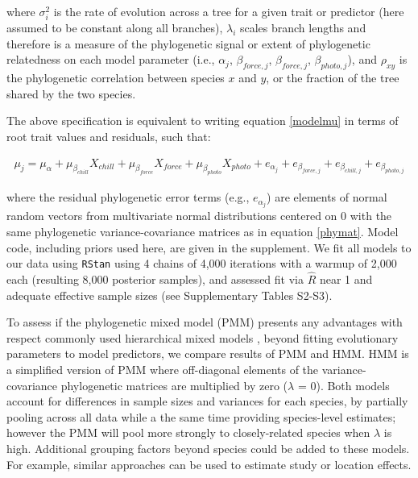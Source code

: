 \documentclass[11pt]{article}
\begin{document}
\noindent where $\sigma_i^2$ is the rate of evolution across a tree for a given trait or predictor (here assumed to be constant along all branches), $\lambda_i$ scales branch lengths and therefore is a measure of the phylogenetic signal or extent of phylogenetic relatedness on each model parameter (i.e., $\alpha_{j}$, $\beta_{force,j}$, $\beta_{force,j}$, $\beta_{photo,j}$), and $\rho_{xy}$ is the phylogenetic correlation between species $x$ and $y$, or the fraction of the tree shared by the two species.

The above specification is equivalent to writing equation \ref{modelmu} in terms of root trait values and residuals, such that:

\begin{align}
  \label{eqfive}
  \mu_j = \mu_\alpha + \mu_{\beta_{chill}} X_{chill} + \mu_{\beta_{force}} X_{force} + \mu_{\beta_{photo}} X_{photo} + e_{\alpha_{j}} + e_{\beta_{force,j}} + e_{\beta_{chill,j}} + e_{\beta_{photo,j}}
\end{align}

\noindent where the residual phylogenetic error terms (e.g., $e_{\alpha_{j}}$) are elements of normal random vectors from multivariate normal distributions centered on $0$ with the same phylogenetic variance-covariance matrices as in equation \ref{phymat}. Model code, including priors used here, are given in the supplement. We fit all models to our data using \verb|RStan| using 4 chains of 4,000 iterations with a warmup of 2,000 each (resulting 8,000 posterior samples), and assessed fit via $\hat{R}$ near 1 and adequate effective sample sizes (see Supplementary Tables S2-S3). 

To assess if the phylogenetic mixed model (PMM) presents any advantages with respect commonly used hierarchical mixed models \citep[HMM; see e.g., ][]{ettinger2020}, beyond fitting evolutionary parameters to model predictors, we compare results of PMM and HMM. HMM is a simplified version of PMM where off-diagonal elements of the variance-covariance phylogenetic matrices are multiplied by zero ($\lambda$ = 0). Both models account for differences in sample sizes and variances for each species, by partially pooling across all data while a the same time providing species-level estimates; however the PMM will pool more strongly to closely-related species when $\lambda$ is high. Additional grouping factors beyond species could be added to these models. For example, similar approaches can be used to estimate study or location effects.
\end{document}
